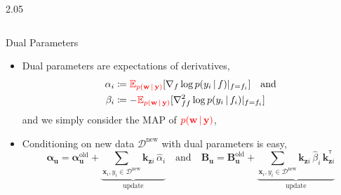 \documentclass[final,12pt]{beamer}
\newlength{\colwidth}
\newcommand{\mathbold}[1]{\bm{#1}}
\newcommand{\mbf}[1]{\mathbf{#1}}
\newcommand{\T}{^\mathsf{T}}
\newcommand{\valpha}[0]{\mathbold{\alpha}}
\newcommand{\vbeta}[0]{\mathbold{\beta}}
\renewcommand{\mid}{\,|\,}
\newcommand{\vu}{\mbf{u}}
\newcommand{\vw}{\mbf{w}}
\newcommand{\vx}{\mbf{x}}
\newcommand{\vy}{\mbf{y}}
\newcommand{\vkzi}{\mbf{k}_{\mbf{z}i}}
\newcommand{\MBeta}[0]{\mathbold{B}}
\newcommand{\R}{\mathbb{R}}
\newcommand{\myexpect}{\mathbb{E}}
\newcommand{\dataset}{\ensuremath{\mathcal{D}}}
\begin{document}
\begin{frame}[t]
\begin{columns}[t]
\begin{column}{2.05\colwidth}
\begin{columns}[t]

\begin{column}{\colwidth}

    \begin{block}{Dual Parameters}
      \begin{itemize}
        \item \alert{Dual parameters} are expectations of derivatives, %
            \begin{align}
            \alpha_i &\coloneqq {\color{red}{\myexpect_{p(\vw \mid \vy)}}}[\nabla_{f}\log p(y_i \mid f) |_{f=f_i}]
            \quad \text{and} \\
            \beta_i &\coloneqq - {\color{red}{\myexpect_{p(\vw \mid \vy)}}}[\nabla^2_{f f}\log p(y_i \mid f_i) |_{f=f_i}]
            \end{align}
            and we simply consider the MAP of ${\color{red}{p(\vw \mid \vy)}}$,

        \item Conditioning on new data $\dataset^{\text{new}}$ with \alert{dual parameters} is easy, %
            \begin{equation}
            \valpha_{\vu}  = \valpha_{\vu}^{\text{old}} +  \underbrace{\sum_{\vx_{i},y_{i} \in \dataset^{\text{new}}}  \vkzi \, \hat{\alpha}_{i}}_{\text{update}} %
            \quad \text{and} \quad
            \MBeta_{\vu} = \MBeta_{\vu}^{\text{old}} +  \underbrace{\sum_{\vx_{i},y_{i} \in \dataset^{\text{new}}} \vkzi \,\hat{\beta}_{i} \, \vkzi^{\T}}_{\text{update}} %
            \nonumber
            \end{equation}
        \end{itemize}

    \end{block}



\end{column}
\end{columns}
\end{column}
\end{columns}
\end{frame}
\end{document}

